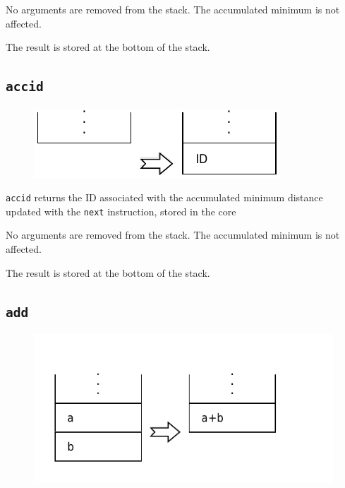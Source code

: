 			No arguments are removed from the stack. The accumulated minimum is
			not affected.
			
			The result is stored at the bottom of the stack.
	
	\qquad
	
	\subsection*{\texttt{accid}}
	
		\begin{figure}
			\begin{flushright}
				\includegraphics[width=\linewidth]{figure/pdf/i_accid} 
			\end{flushright}
		\end{figure}
	
			\texttt{accid} returns the ID associated with the accumulated
			minimum distance updated with the \texttt{next} instruction, stored
			in the core
			
			No arguments are removed from the stack. The accumulated minimum is
			not affected.
			
			The result is stored at the bottom of the stack.
	
	\qquad
	
	\subsection*{\texttt{add}}
	
		\begin{figure}
			\begin{flushright}
				\includegraphics[width=\linewidth]{figure/pdf/i_add} 
			\end{flushright}
		\end{figure}
	
